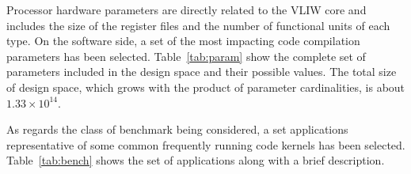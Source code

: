 Processor hardware parameters are directly related to the VLIW core
and includes the size of the register files and the number of
functional units of each type. On the software side, a set of the most
impacting code compilation parameters has been selected.
Table~\ref{tab:param} show the complete set of parameters included in
the design space and their possible values. The total size of design
space, which grows with the product of parameter cardinalities, is
about $1.33 \times 10^{14}$.


As regards the class of benchmark being considered, a set applications representative of some common
frequently running code kernels has been selected. Table~\ref{tab:bench} shows the set of applications
along with a brief description.


